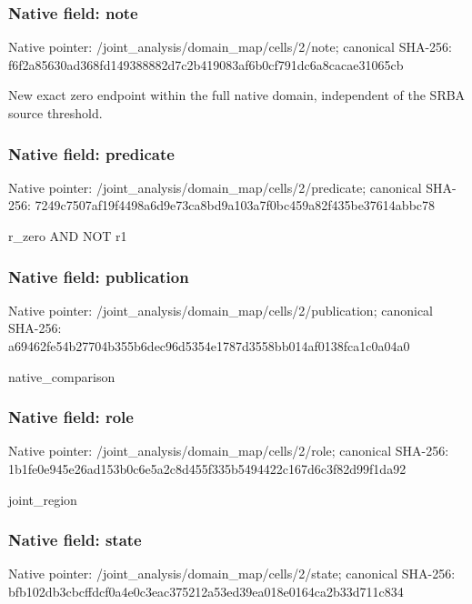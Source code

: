 \documentclass[10pt,a4paper]{article}
\begin{document}
\subsubsection{Native field: note}
Native pointer: /joint\_\allowbreak{}analysis/domain\_\allowbreak{}map/cells/2/note; canonical SHA-256: f6f2a85630ad368fd149388882d7c2b419083af6b0cf791dc6a8cacae31065cb

\begingroup\raggedright\sloppy New exact zero endpoint within the full native domain,\allowbreak{} independent of the SRBA source threshold.\par\endgroup

\subsubsection{Native field: predicate}
Native pointer: /joint\_\allowbreak{}analysis/domain\_\allowbreak{}map/cells/2/predicate; canonical SHA-256: 7249c7507af19f4498a6d9e73ca8bd9a103a7f0bc459a82f435be37614abbc78

\begingroup\raggedright\sloppy r\_\allowbreak{}zero AND NOT r1\par\endgroup

\subsubsection{Native field: publication}
Native pointer: /joint\_\allowbreak{}analysis/domain\_\allowbreak{}map/cells/2/publication; canonical SHA-256: a69462fe54b27704b355b6dec96d5354e1787d3558bb014af0138fca1c0a04a0

\begingroup\raggedright\sloppy native\_\allowbreak{}comparison\par\endgroup

\subsubsection{Native field: role}
Native pointer: /joint\_\allowbreak{}analysis/domain\_\allowbreak{}map/cells/2/role; canonical SHA-256: 1b1fe0e945e26ad153b0c6e5a2c8d455f335b5494422c167d6c3f82d99f1da92

\begingroup\raggedright\sloppy joint\_\allowbreak{}region\par\endgroup

\subsubsection{Native field: state}
Native pointer: /joint\_\allowbreak{}analysis/domain\_\allowbreak{}map/cells/2/state; canonical SHA-256: bfb102db3cbcffdcf0a4e0c3eac375212a53ed39ea018e0164ca2b33d711c834
\end{document}
